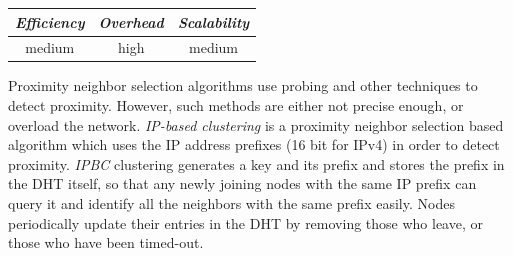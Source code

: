 %
%
%

\begin{center}
\begin{tabular}{ccc}
\emph{Efficiency} & \emph{Overhead} & \emph{Scalability} \\
\hline
medium &
high &
medium
\end{tabular}
\end{center}

Proximity neighbor selection algorithms use probing and other techniques to
detect proximity. However, such methods are either not precise enough, or
overload the network. \emph{IP-based clustering} \cite{KM2007} is a proximity
neighbor selection based algorithm which uses the IP address prefixes (16 bit
for IPv4) in order to detect proximity. \emph{IPBC} clustering generates a key
and its prefix and stores the prefix in the DHT itself, so that any newly
joining nodes with the same IP prefix can query it and
identify all the neighbors with the same prefix easily.  Nodes
periodically update their entries in the DHT by removing those who leave, or
those who have been timed-out.


